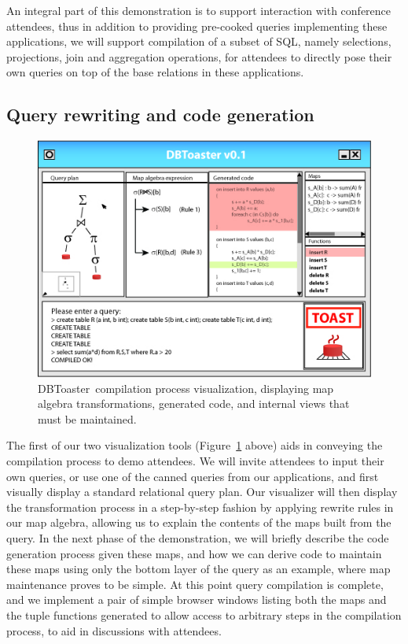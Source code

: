 \documentclass{vldb}
\newcommand{\comment}[1]{}
\newcommand{\compiler}{DBToaster}
\begin{document}
An integral part of this demonstration is to support interaction with conference
attendees, thus in addition to providing pre-cooked queries implementing these
applications, we will support compilation of a subset of SQL, namely selections,
projections, join and aggregation operations, for attendees to directly pose
their own queries on top of the base relations in these applications.




\subsection{Query rewriting and code generation}

\begin{figure}
\begin{center}
\includegraphics[scale=0.47]{figures/gui1}
\end{center}
\caption{\compiler\ compilation process visualization, displaying map algebra
transformations, generated code, and internal views that must be maintained.}
\label{fig:compilegui}
\end{figure}

The first of our two visualization tools (Figure~\ref{fig:compilegui} above) aids
in conveying the compilation process to demo attendees. We will invite attendees
to input their own queries, or use one of the canned queries from our
applications, and first visually display a standard relational query plan. Our
visualizer will then display the transformation process in a step-by-step fashion
by applying rewrite rules in our map algebra, allowing us to explain the contents
of the maps built from the query. In the next phase of the demonstration, we will
briefly describe the code generation process given these maps, and how we can
derive code to maintain these maps using only the bottom layer of the query as an
example, where map maintenance proves to be simple. At this point query
compilation is complete, and we implement a pair of simple browser windows
listing both the maps and the tuple functions generated to allow access to
arbitrary steps in the compilation process, to aid in discussions with attendees.
\comment{
Depending on the
demonstration progress, we may additionally include an example of a
JIT-compilation of the example query to demonstrate the potential for a limited
degree of adaptivity during query execution.
}
\end{document}
